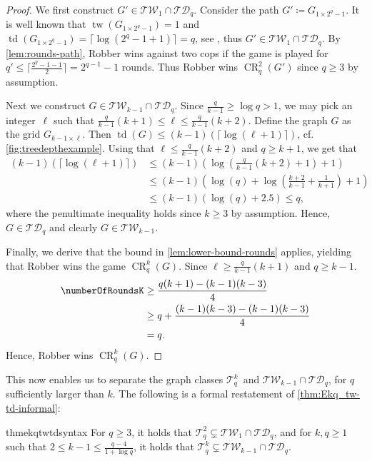 \documentclass{lmcs}
\theoremstyle{plain}\newtheorem{claim}[thm]{Claim}   %
\newcommand{\cT}{\ensuremath{\mathcal T}}
\DeclareMathOperator{\tw}{tw}
\DeclareMathOperator{\td}{td}
\DeclareMathOperator{\CR}{CR}
\newcommand{\TW}{\ensuremath{\mathcal{TW}}}
\newcommand{\TD}{\ensuremath{\mathcal{TD}}}
\newcommand{\Ekq}{\ensuremath{\cT_{q}^{k}}}
\newcommand{\EParam}[2]{\ensuremath{\cT_{#2}^{#1}}}
\newcommand{\grid}[2]{\ensuremath{G_{#1 \times #2}}}
\begin{document}
\begin{proof}
	We first construct $G'\in \TW_{1}\cap\TD_q$.
	Consider the path $G'\coloneqq\grid{1}{2^q-1}$.
	It is well known that $\tw(\grid{1}{2^q-1})=1$ and $\td(\grid{1}{2^q-1}) =  \lceil \log(2^q-1+1)\rceil = q$, see  \cite[(6.2)]{Nesetril_sparsity_2012}, thus $G' \in \TW_{1}\cap\TD_q$.
	By \autoref{lem:rounds-path}, Robber wins against two cops if the game is played for $q' \leq \lceil \frac{2^q-1-1}{2}\rceil=2^{q-1} -1$ rounds.
	Thus Robber wins $\CR_q^2(G')$ since $q \geq 3$ by assumption.
	
	Next we construct $G\in\TW_{k-1}\cap\TD_q$.
	Since $\frac{q}{k-1} \geq \log q > 1$, we may pick an integer~$\ell$ such that $\frac{q}{k-1}(k+1) \leq \ell \leq \frac{q}{k-1}(k+2)$.  
	Define the graph $G$ as the grid $\grid{k-1}{\ell}$.
	Then $\td(G) \leq (k-1)(\lceil \log (\ell+1)\rceil)$, cf.\@ \autoref{fig:treedepthexample}.
	Using that $\ell \leq \frac{q}{k-1}(k+2)$ and $q \geq k+1$, we get that 
	\begin{align*}
		(k-1)(\lceil \log (\ell+1)\rceil) &\leq (k-1)\left( \log \left(\frac{q}{k-1}(k+2) + 1 \right)+1\right)\\
		&\leq (k-1)\left( \log (q)+\log\left(\frac{k+2}{k-1} + \frac{1}{k+1} \right)+1\right)\\
		&\leq (k-1)\left( \log (q)+2.5 \right) \leq q,
	\end{align*}
	where the penultimate inequality holds since $k \geq 3$ by assumption.
	Hence, $G \in \TD_q$ and clearly $G \in \TW_{k-1}$.
	
	Finally, we derive that the bound in \autoref{lem:lower-bound-rounds} applies, yielding that Robber wins the game $\CR_q^k(G)$.
	Since $\ell \geq \frac{q}{k-1}(k+1)$ and $q \geq k-1$.
	\begin{align*}
		\numberOfRoundsK 
		& \geq \frac{q(k+1) - (k-1)(k-3)}{4} \\ 
		& \geq q + \frac{(k-1)(k-3) - (k-1)(k-3)}{4} \\
		& = q.
	\end{align*}
	Hence, Robber wins $\CR_q^k(G)$.
\end{proof}

This now enables us to separate the graph classes \Ekq\ and $\TW_{k-1}\cap\TD_q$, for $q$ sufficiently larger than $k$.
The following is a formal restatement of \autoref{thm:Ekq_tw-td-informal}:

\begin{restatable}{thm}{ekqtwtdsyntax}
	\label{thm:Ekq_tw-td}
	For $q\geq 3$, it holds that $\EParam{2}{q}\subsetneq \TW_{1}\cap\TD_q$, and for $k,q\geq 1$ such that $2\leq k-1\leq\frac{q-4}{1+\log q}$, it holds that $\Ekq\subsetneq \TW_{k-1}\cap\TD_q$.
\end{restatable}
\end{document}
